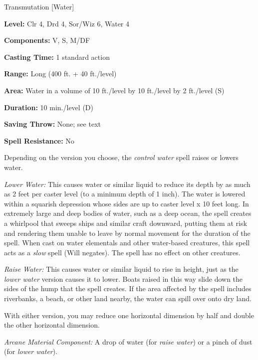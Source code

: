 
Transmutation [Water]

\textbf{Level:} Clr 4, Drd 4, Sor/Wiz 6, Water 4

\textbf{Components:} V, S, M/DF

\textbf{Casting Time:} 1 standard action

\textbf{Range:} Long (400 ft. + 40 ft./level)

\textbf{Area:} Water in a volume of 10 ft./level by 10 ft./level by 2 ft./level 
(S)

\textbf{Duration:} 10 min./level (D)

\textbf{Saving Throw:} None; see text

\textbf{Spell Resistance:} No

Depending on the version you choose, the \textit{control water} spell raises or 
lowers water.

\textit{Lower Water:} This causes water or similar liquid to reduce its depth by 
as much as 2 feet per caster level (to a minimum depth of 1 inch). The water is 
lowered within a squarish depression whose sides are up to caster level x 10 feet 
long. In extremely large and deep bodies of water, such as a deep ocean, the spell 
creates a whirlpool that sweeps ships and similar craft downward, putting them 
at risk and rendering them unable to leave by normal movement for the duration 
of the spell. When cast on water elementals and other water-based creatures, this 
spell acts as a \textit{slow} spell (Will negates). The spell has no effect on 
other creatures.

\textit{Raise Water:} This causes water or similar liquid to rise in height, just 
as the \textit{lower water} version causes it to lower. Boats raised in this way 
slide down the sides of the hump that the spell creates. If the area affected by 
the spell includes riverbanks, a beach, or other land nearby, the water can spill 
over onto dry land.

With either version, you may reduce one horizontal dimension by half and double 
the other horizontal dimension.

\textit{Arcane Material Component:} A drop of water (for \textit{raise water}) 
or a pinch of dust (for \textit{lower water}).

